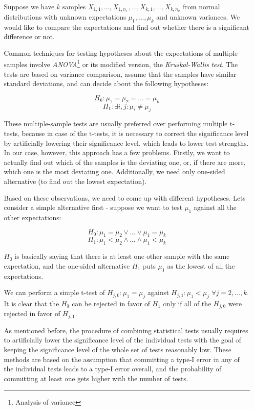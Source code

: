 Suppose we have $k$ samples $X_{1,1}, ..., X_{1, n_1}, ..., X_{k,1}, ..., X_{k, n_k}$ from normal distributions with unknown expectations $\mu_1, ..., \mu_k$ and unknown variances. We would like to compare the expectations and find out whether there is a significant difference or not.

Common techniques for testing hypotheses about the expectations of multiple samples involve \textit{ANOVA}\footnote{Analysis of variance} or its modified version, the \textit{Kruskal-Wallis test}. The tests are based on variance comparison, assume that the samples have similar standard deviations, and can decide about the following hypotheses:


\[
H_0: \mu_1 = \mu_2 = ... = \mu_k
\]
\[
H_1: \exists i, j: \mu_i \neq \mu_j
\]

These multiple-sample tests are usually preferred over performing multiple t-tests, because in case of the t-tests, it is necessary to correct the significance level by artificially lowering their significance level, which leads to lower test strengths. In our case, however, this approach has a few problems. Firstly, we want to actually find out which of the samples is the deviating one, or, if there are more, which one is the most deviating one. Additionally, we need only one-sided alternative (to find out the lowest expectation). 

Based on these observations, we need to come up with different hypotheses. Lets consider a simple alternative first - suppose we want to test $\mu_1$ against all the other expectations:

\[
H_0: \mu_1 = \mu_2 \vee ... \vee \mu_1 = \mu_k
\]
\[
H_1: \mu_1 < \mu_2 \wedge ... \wedge \mu_1 < \mu_k
\]

$H_0$ is basically saying that there is at least one other sample with the same expectation, and the one-sided alternative $H_1$ puts $\mu_1$ as the lowest of all the expectations.

We can perform a simple t-test of $H_{j,0}: \mu_1 = \mu_j$ against $H_{j,1}: \mu_1 < \mu_j$ $\forall j = 2, ..., k$. It is clear that the $H_0$ can be rejected in favor of $H_1$ only if all of the $H_{j,0}$ were rejected in favor of $H_{j,1}$. 

As mentioned before, the procedure of combining statistical tests usually requires to artificially lower the significance level of the individual tests with the goal of keeping the significance level of the whole set of tests reasonably low. These methods are based on the assumption that committing a type-I error in any of the individual tests leads to a type-I error overall, and the probability of committing at least one gets higher with the number of tests.

